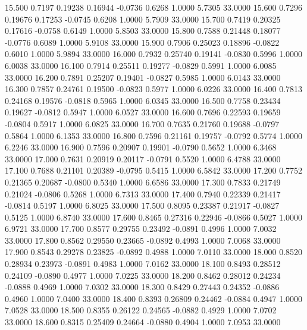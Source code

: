   15.500   0.7197   0.19238   0.16944  -0.0736   0.6268   1.0000   5.7305  33.0000
  15.600   0.7296   0.19676   0.17253  -0.0745   0.6208   1.0000   5.7909  33.0000
  15.700   0.7419   0.20325   0.17616  -0.0758   0.6149   1.0000   5.8503  33.0000
  15.800   0.7588   0.21448   0.18077  -0.0776   0.6089   1.0000   5.9108  33.0000
  15.900   0.7906   0.25023   0.18896  -0.0822   0.6010   1.0000   5.9894  33.0000
  16.000   0.7932   0.25740   0.19141  -0.0830   0.5996   1.0000   6.0038  33.0000
  16.100   0.7914   0.25511   0.19277  -0.0829   0.5991   1.0000   6.0085  33.0000
  16.200   0.7891   0.25207   0.19401  -0.0827   0.5985   1.0000   6.0143  33.0000
  16.300   0.7857   0.24761   0.19500  -0.0823   0.5977   1.0000   6.0226  33.0000
  16.400   0.7813   0.24168   0.19576  -0.0818   0.5965   1.0000   6.0345  33.0000
  16.500   0.7758   0.23434   0.19627  -0.0812   0.5947   1.0000   6.0527  33.0000
  16.600   0.7696   0.22593   0.19659  -0.0804   0.5917   1.0000   6.0825  33.0000
  16.700   0.7635   0.21760   0.19688  -0.0797   0.5864   1.0000   6.1353  33.0000
  16.800   0.7596   0.21161   0.19757  -0.0792   0.5774   1.0000   6.2246  33.0000
  16.900   0.7596   0.20907   0.19901  -0.0790   0.5652   1.0000   6.3468  33.0000
  17.000   0.7631   0.20919   0.20117  -0.0791   0.5520   1.0000   6.4788  33.0000
  17.100   0.7688   0.21101   0.20389  -0.0795   0.5415   1.0000   6.5842  33.0000
  17.200   0.7752   0.21365   0.20687  -0.0800   0.5340   1.0000   6.6586  33.0000
  17.300   0.7833   0.21749   0.21024  -0.0806   0.5268   1.0000   6.7313  33.0000
  17.400   0.7940   0.22339   0.21417  -0.0814   0.5197   1.0000   6.8025  33.0000
  17.500   0.8095   0.23387   0.21917  -0.0827   0.5125   1.0000   6.8740  33.0000
  17.600   0.8465   0.27316   0.22946  -0.0866   0.5027   1.0000   6.9721  33.0000
  17.700   0.8577   0.29755   0.23492  -0.0891   0.4996   1.0000   7.0032  33.0000
  17.800   0.8562   0.29550   0.23665  -0.0892   0.4993   1.0000   7.0068  33.0000
  17.900   0.8543   0.29278   0.23825  -0.0892   0.4988   1.0000   7.0110  33.0000
  18.000   0.8520   0.28934   0.23973  -0.0891   0.4983   1.0000   7.0162  33.0000
  18.100   0.8493   0.28512   0.24109  -0.0890   0.4977   1.0000   7.0225  33.0000
  18.200   0.8462   0.28012   0.24234  -0.0888   0.4969   1.0000   7.0302  33.0000
  18.300   0.8429   0.27443   0.24352  -0.0886   0.4960   1.0000   7.0400  33.0000
  18.400   0.8393   0.26809   0.24462  -0.0884   0.4947   1.0000   7.0528  33.0000
  18.500   0.8355   0.26122   0.24565  -0.0882   0.4929   1.0000   7.0702  33.0000
  18.600   0.8315   0.25409   0.24664  -0.0880   0.4904   1.0000   7.0953  33.0000
